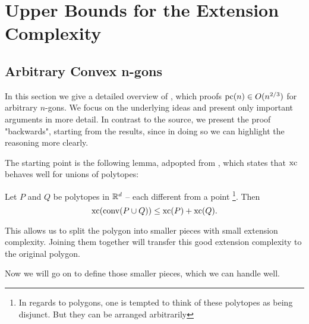 \section{Upper Bounds for the Extension Complexity}

\subsection{Arbitrary Convex n-gons}

In this section we give a detailed overview of \cite{shitov2020sublinear}, which proofs $\operatorname{pc}(n) \in O(n^{2/3})$ for arbitrary $n$-gons. 
We focus on the underlying ideas and present only important arguments in more detail. In contrast to the source, we present the proof "backwards", starting from the results, since in doing so we can highlight the reasoning more clearly.


The starting point is the following lemma, adpopted from \cite[Proposition 3.1.1]{weltge2015sizes}, which states that $\operatorname{xc}$ behaves well for unions of polytopes:
\begin{lemma}\label{lemma:union}
  Let $P$ and $Q$ be polytopes in $\mathbb{R}^d$ -- each different from a point \footnote{In regards to polygons, one is tempted to think of these polytopes as being disjunct. But they can be arranged arbitrarily}. Then $$\operatorname{xc}(\operatorname{conv}(P \cup Q)) \leq \operatorname{xc}(P) + \operatorname{xc}(Q) .$$
\end{lemma}

This allows us to split the polygon into smaller pieces with small extension complexity. Joining them together will transfer this good extension complexity to the original polygon.

Now we will go on to define those smaller pieces, which we can handle well.

\begin{definition}
\end{definition}
\begin{observation}\label{observation:splitting}
\end{observation}

